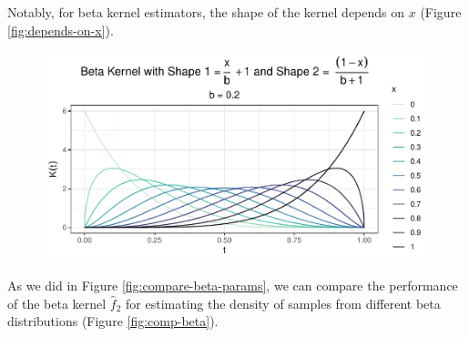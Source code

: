 \documentclass[12pt,twoside]{smiththesis}
\begin{document}
Notably, for beta kernel estimators, the shape of the kernel depends on \(x\) (Figure \ref{fig:depends-on-x}).
\begin{figure}

{\centering \includegraphics[width=1\linewidth]{thesis_files/figure-latex/unnamed-chunk-46-1} 

}

\caption{\label{fig:depends-on-x}}\label{fig:unnamed-chunk-46}
\end{figure}
As we did in Figure \ref{fig:compare-beta-params}, we can compare the performance of the beta kernel \(\hat f_2\) for estimating the density of samples from different beta distributions (Figure \ref{fig:comp-beta}).
\end{document}
